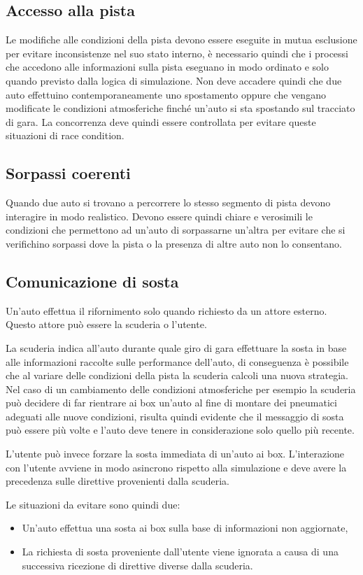 \documentclass[11pt,a4paper]{report}
\begin{document}
\subsection*{Accesso alla pista}
Le modifiche alle condizioni della pista devono essere eseguite in mutua esclusione per evitare inconsistenze nel suo stato interno, è necessario quindi che i processi che accedono alle informazioni sulla pista eseguano in modo ordinato e solo quando previsto dalla logica di simulazione. Non deve accadere quindi che due auto effettuino contemporaneamente uno spostamento oppure che vengano modificate le condizioni atmosferiche finché un'auto si sta spostando sul tracciato di gara.
La concorrenza deve quindi essere controllata per evitare queste situazioni di race condition.

\subsection*{Sorpassi coerenti}
Quando due auto si trovano a percorrere lo stesso segmento di pista devono interagire in modo realistico. Devono essere quindi chiare e verosimili le condizioni che permettono ad un'auto di sorpassarne un'altra per evitare che si verifichino sorpassi dove la pista o la presenza di altre auto non lo consentano.
\subsection*{Comunicazione di sosta}
Un'auto effettua il rifornimento solo quando richiesto da un attore esterno. Questo attore può essere la scuderia o l'utente.

La scuderia indica all'auto durante quale giro di gara effettuare la sosta in base alle informazioni raccolte sulle performance dell'auto, di conseguenza è possibile che al variare delle condizioni della pista la scuderia calcoli una nuova strategia. Nel caso di un cambiamento delle condizioni atmosferiche per esempio la scuderia può decidere di far rientrare ai box un'auto al fine di montare dei pneumatici adeguati alle nuove condizioni, risulta quindi evidente che il messaggio di sosta può essere più volte e l'auto deve tenere in considerazione solo quello più recente.

L'utente può invece forzare la sosta immediata di un'auto ai box. L'interazione con l'utente avviene in modo asincrono rispetto alla simulazione e deve avere la precedenza sulle direttive provenienti dalla scuderia.

Le situazioni da evitare sono quindi due:
\begin{itemize}
\item Un'auto effettua una sosta ai box sulla base di informazioni non aggiornate,
\item La richiesta di sosta proveniente dall'utente viene ignorata a causa di una successiva ricezione di direttive diverse dalla scuderia.
\end{itemize}
\end{document}
